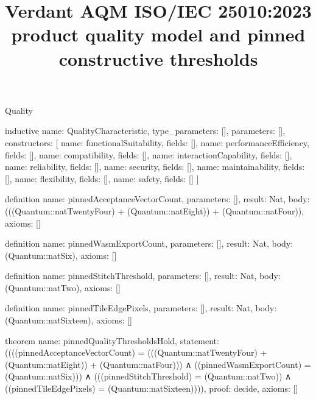 \begin{lexlean}{Quality}
\title{Verdant AQM ISO/IEC 25010:2023 product quality model and pinned constructive thresholds}

\begin{semanticmodule}

inductive{
  name: QualityCharacteristic,
  type_parameters: [],
  parameters: [],
  constructors: [
    {name: functionalSuitability, fields: []},
    {name: performanceEfficiency, fields: []},
    {name: compatibility, fields: []},
    {name: interactionCapability, fields: []},
    {name: reliability, fields: []},
    {name: security, fields: []},
    {name: maintainability, fields: []},
    {name: flexibility, fields: []},
    {name: safety, fields: []}
  ]
}

definition{
  name: pinnedAcceptanceVectorCount,
  parameters: [],
  result: Nat,
  body: (((Quantum::natTwentyFour) + (Quantum::natEight)) + (Quantum::natFour)),
  axioms: []
}

definition{
  name: pinnedWasmExportCount,
  parameters: [],
  result: Nat,
  body: (Quantum::natSix),
  axioms: []
}

definition{
  name: pinnedStitchThreshold,
  parameters: [],
  result: Nat,
  body: (Quantum::natTwo),
  axioms: []
}

definition{
  name: pinnedTileEdgePixels,
  parameters: [],
  result: Nat,
  body: (Quantum::natSixteen),
  axioms: []
}

theorem{
  name: pinnedQualityThresholdsHold,
  statement: ((((pinnedAcceptanceVectorCount) = (((Quantum::natTwentyFour) + (Quantum::natEight)) + (Quantum::natFour)))
    ∧ ((pinnedWasmExportCount) = (Quantum::natSix)))
    ∧ (((pinnedStitchThreshold) = (Quantum::natTwo))
      ∧ ((pinnedTileEdgePixels) = (Quantum::natSixteen)))),
  proof: decide{},
  axioms: []
}

\end{semanticmodule}
\end{lexlean}

